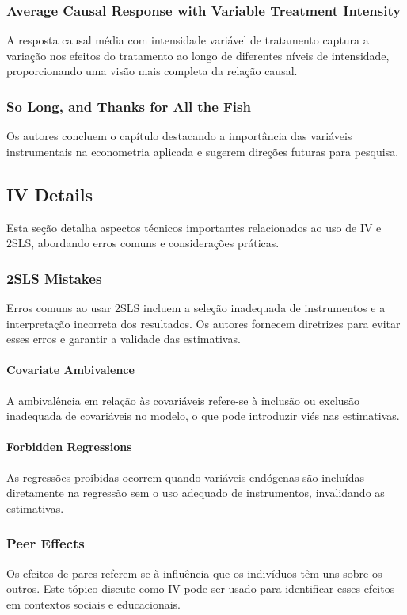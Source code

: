 \documentclass[a4paper,12pt]{article}[abntex2]
\begin{document}
\subsubsection{Average Causal Response with Variable Treatment Intensity}
A resposta causal média com intensidade variável de tratamento captura a variação nos efeitos do tratamento ao longo de diferentes níveis de intensidade, proporcionando uma visão mais completa da relação causal.

\subsubsection{So Long, and Thanks for All the Fish}
Os autores concluem o capítulo destacando a importância das variáveis instrumentais na econometria aplicada e sugerem direções futuras para pesquisa.

\subsection{IV Details}
Esta seção detalha aspectos técnicos importantes relacionados ao uso de IV e 2SLS, abordando erros comuns e considerações práticas.

\subsubsection{2SLS Mistakes}
Erros comuns ao usar 2SLS incluem a seleção inadequada de instrumentos e a interpretação incorreta dos resultados. Os autores fornecem diretrizes para evitar esses erros e garantir a validade das estimativas.

\paragraph{Covariate Ambivalence}
A ambivalência em relação às covariáveis refere-se à inclusão ou exclusão inadequada de covariáveis no modelo, o que pode introduzir viés nas estimativas.

\paragraph{Forbidden Regressions}
As regressões proibidas ocorrem quando variáveis endógenas são incluídas diretamente na regressão sem o uso adequado de instrumentos, invalidando as estimativas.

\subsubsection{Peer Effects}
Os efeitos de pares referem-se à influência que os indivíduos têm uns sobre os outros. Este tópico discute como IV pode ser usado para identificar esses efeitos em contextos sociais e educacionais.
\end{document}
